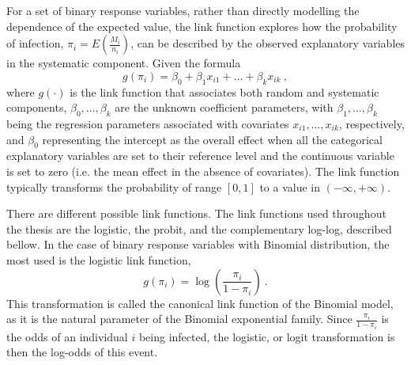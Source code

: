 For a set of binary response variables, rather than directly modelling the dependence of the expected value, the link function explores how the probability of infection, $\pi_i=E(\frac{M_i}{n_i})$, can be described by the observed explanatory variables in the systematic component.
Given the formula
%
\begin{equation}
    \label{eq:link}
    g(\pi_i)=\beta_0+\beta_1x_{i1}+\dots+\beta_k x_{ik}\ ,
\end{equation}
%
\noindent
where $g(\cdot)$ is the link function that associates both random and systematic components, $\beta_0,\ldots,\beta_k$ are the unknown coefficient parameters, with $\beta_{1},\ldots,\beta_{k}$ being the regression parameters associated with covariates $x_{i1},\ldots,x_{ik}$, respectively, and $\beta_{0}$ representing the intercept as the overall effect when all the categorical explanatory variables are set to their reference level and the continuous variable is set to zero (i.e. the mean effect in the absence of covariates).
The link function typically transforms the probability of range $[0,1]$ to a value in $(-\infty, +\infty)$.

There are different possible link functions.
The link functions used throughout the thesis are the logistic, the probit, and the complementary log-log, described bellow.
In the case of binary response variables with Binomial distribution, the most used is the logistic link function,
%
\begin{equation}
    \label{eq:logit}
    g(\pi_i)=\log\left(\frac{\pi_i}{1-\pi_i}\right)\ .
\end{equation}
%
\noindent
This transformation is called the canonical link function of the Binomial model, as it is the natural parameter of the Binomial exponential family.
Since $\frac{\pi_i}{1-\pi_i}$ is the  odds  of an individual $i$ being infected, the logistic, or logit transformation is then the log-odds of this event.

